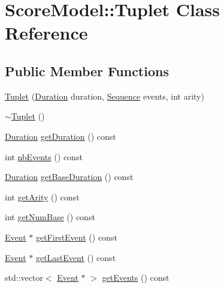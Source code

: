 \hypertarget{classScoreModel_1_1Tuplet}{}\section{Score\+Model\+::Tuplet Class Reference}
\label{classScoreModel_1_1Tuplet}
\subsection*{Public Member Functions}
\begin{DoxyCompactItemize}
\item 
\mbox{\hyperlink{classScoreModel_1_1Tuplet_a123005c7ef369e5120cea3dfad0dc0d3}{Tuplet}} (\mbox{\hyperlink{classScoreModel_1_1Duration}{Duration}} duration, \mbox{\hyperlink{classScoreModel_1_1Sequence}{Sequence}} events, int arity)
\item 
\mbox{\hyperlink{classScoreModel_1_1Tuplet_ac2a62e001a5238d3d31adf1c73294cbe}{$\sim$\+Tuplet}} ()
\item 
\mbox{\hyperlink{classScoreModel_1_1Duration}{Duration}} \mbox{\hyperlink{classScoreModel_1_1Tuplet_afed370448df347005471cffea59fa60a}{get\+Duration}} () const
\item 
int \mbox{\hyperlink{classScoreModel_1_1Tuplet_af1c41eda48b4f7ad792bd01bfbda8a58}{nb\+Events}} () const
\item 
\mbox{\hyperlink{classScoreModel_1_1Duration}{Duration}} \mbox{\hyperlink{classScoreModel_1_1Tuplet_ad638693da54a63af98d2532163fd7d62}{get\+Base\+Duration}} () const
\item 
int \mbox{\hyperlink{classScoreModel_1_1Tuplet_a994676b3ff11c59784db05233d3a3134}{get\+Arity}} () const
\item 
int \mbox{\hyperlink{classScoreModel_1_1Tuplet_a6a62f30eaf94ab7b329882552cf96a68}{get\+Num\+Base}} () const
\item 
\mbox{\hyperlink{classScoreModel_1_1Event}{Event}} $\ast$ \mbox{\hyperlink{classScoreModel_1_1Tuplet_a4c0ccffd5ee162176ad7dfcef1a9cd58}{get\+First\+Event}} () const
\item 
\mbox{\hyperlink{classScoreModel_1_1Event}{Event}} $\ast$ \mbox{\hyperlink{classScoreModel_1_1Tuplet_acd616d4a0464012de5e3125ed318fd30}{get\+Last\+Event}} () const
\item 
std\+::vector$<$ \mbox{\hyperlink{classScoreModel_1_1Event}{Event}} $\ast$ $>$ \mbox{\hyperlink{classScoreModel_1_1Tuplet_a6091b290c47f35d5d9fcc47bfb6f1a5c}{get\+Events}} () const
\end{DoxyCompactItemize}


